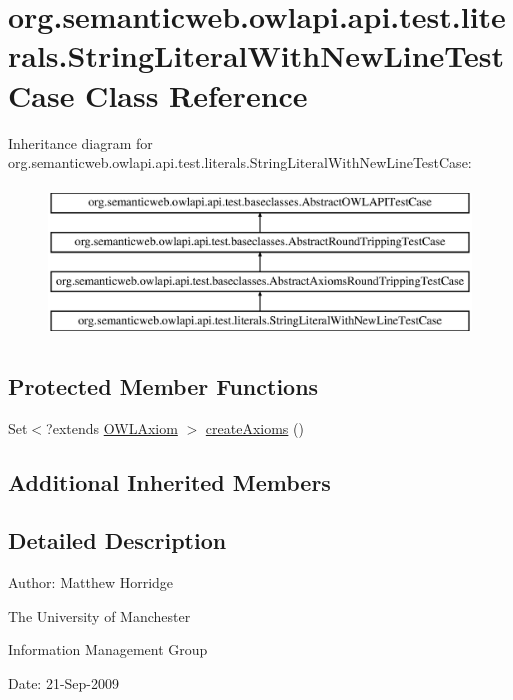 \hypertarget{classorg_1_1semanticweb_1_1owlapi_1_1api_1_1test_1_1literals_1_1_string_literal_with_new_line_test_case}{\section{org.\-semanticweb.\-owlapi.\-api.\-test.\-literals.\-String\-Literal\-With\-New\-Line\-Test\-Case Class Reference}
\label{classorg_1_1semanticweb_1_1owlapi_1_1api_1_1test_1_1literals_1_1_string_literal_with_new_line_test_case}
}
Inheritance diagram for org.\-semanticweb.\-owlapi.\-api.\-test.\-literals.\-String\-Literal\-With\-New\-Line\-Test\-Case\-:\begin{figure}[H]
\begin{center}
\leavevmode
\includegraphics[height=4.000000cm]{classorg_1_1semanticweb_1_1owlapi_1_1api_1_1test_1_1literals_1_1_string_literal_with_new_line_test_case}
\end{center}
\end{figure}
\subsection*{Protected Member Functions}
\begin{DoxyCompactItemize}
\item 
Set$<$?extends \hyperlink{interfaceorg_1_1semanticweb_1_1owlapi_1_1model_1_1_o_w_l_axiom}{O\-W\-L\-Axiom} $>$ \hyperlink{classorg_1_1semanticweb_1_1owlapi_1_1api_1_1test_1_1literals_1_1_string_literal_with_new_line_test_case_a0dd31a0035397965544df48313a887af}{create\-Axioms} ()
\end{DoxyCompactItemize}
\subsection*{Additional Inherited Members}


\subsection{Detailed Description}
Author\-: Matthew Horridge\par
 The University of Manchester\par
 Information Management Group\par
 Date\-: 21-\/\-Sep-\/2009 

